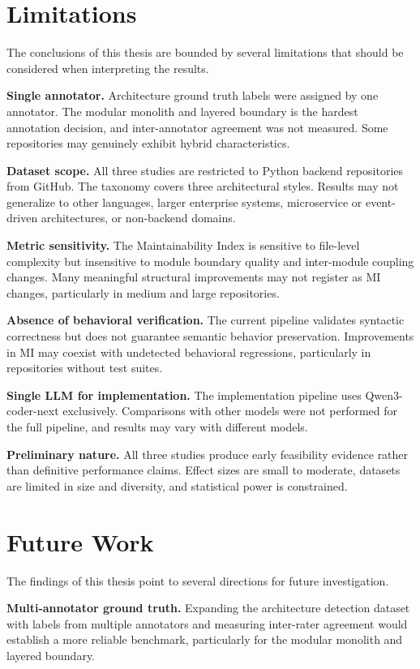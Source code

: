 \section{Limitations}

The conclusions of this thesis are bounded by several limitations that should be considered when interpreting the results.

\textbf{Single annotator.} Architecture ground truth labels were assigned by one annotator. The modular monolith and layered boundary is the hardest annotation decision, and inter-annotator agreement was not measured. Some repositories may genuinely exhibit hybrid characteristics.

\textbf{Dataset scope.} All three studies are restricted to Python backend repositories from GitHub. The taxonomy covers three architectural styles. Results may not generalize to other languages, larger enterprise systems, microservice or event-driven architectures, or non-backend domains.

\textbf{Metric sensitivity.} The Maintainability Index is sensitive to file-level complexity but insensitive to module boundary quality and inter-module coupling changes. Many meaningful structural improvements may not register as MI changes, particularly in medium and large repositories.

\textbf{Absence of behavioral verification.} The current pipeline validates syntactic correctness but does not guarantee semantic behavior preservation. Improvements in MI may coexist with undetected behavioral regressions, particularly in repositories without test suites.

\textbf{Single LLM for implementation.} The implementation pipeline uses Qwen3-coder-next exclusively. Comparisons with other models were not performed for the full pipeline, and results may vary with different models.

\textbf{Preliminary nature.} All three studies produce early feasibility evidence rather than definitive performance claims. Effect sizes are small to moderate, datasets are limited in size and diversity, and statistical power is constrained.

\section{Future Work}

The findings of this thesis point to several directions for future investigation.

\textbf{Multi-annotator ground truth.} Expanding the architecture detection dataset with labels from multiple annotators and measuring inter-rater agreement would establish a more reliable benchmark, particularly for the modular monolith and layered boundary.

